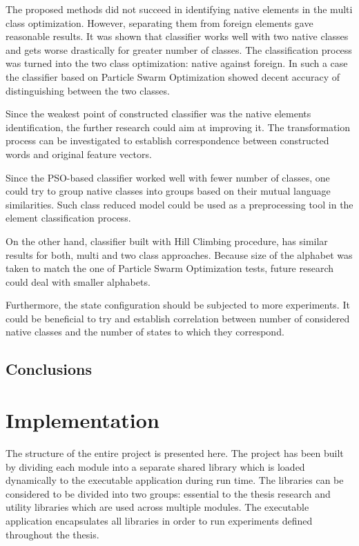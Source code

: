 \documentclass{mini}
\begin{document}
The proposed methods did not succeed in identifying native elements in the multi class optimization. However, separating them from foreign elements gave reasonable results. It was shown that classifier works well with two native classes and gets worse drastically for greater number of classes. The classification process was turned into the two class optimization: native against foreign. In such a case the classifier based on Particle Swarm Optimization showed decent accuracy of distinguishing between the two classes.

Since the weakest point of constructed classifier was the native elements identification, the further research could aim at improving it. The transformation process can be investigated to establish correspondence between constructed words and original feature vectors.

Since the PSO-based classifier worked well with fewer number of classes, one could try to group native classes into groups based on their mutual language similarities. Such class reduced model could be used as a preprocessing tool in the element classification process. 

On the other hand, classifier built with Hill Climbing procedure, has similar results for both, multi and two class approaches. Because size of the alphabet was taken to match the one of Particle Swarm Optimization tests, future research could deal with smaller alphabets.

Furthermore, the state configuration should be subjected to more experiments.
It could be beneficial to try and establish correlation between number of considered native classes and the number of states to which they correspond.


\section{Conclusions}

\appendix\label{appendix_a}

\chapter{Implementation} \label{chap:domain}
The structure of the entire project is presented here.
The project has been built by dividing each module into a separate shared library which is loaded dynamically to the executable application during run time. The libraries can be considered to be divided into two groups: essential to the thesis research and utility libraries which are used across multiple modules. The executable application encapsulates all libraries in order to run experiments defined throughout the thesis.
\end{document}

